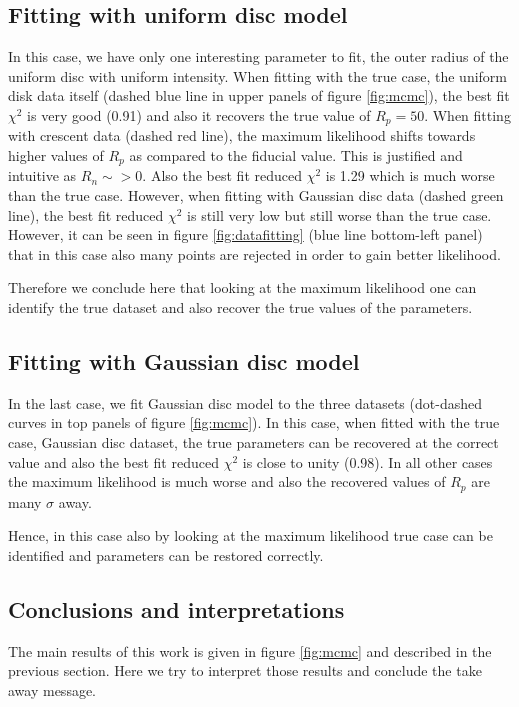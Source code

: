 \subsection{Fitting with uniform disc model}
In this case, we have only one interesting parameter to fit, the outer radius of the uniform disc with uniform intensity. When fitting with the true case, the uniform disk data itself (dashed blue line in upper panels of figure \ref{fig:mcmc}), the best fit $\chi^2$ is very good (0.91) and also it recovers the true value of $R_p=50$. When fitting with crescent data (dashed red line), the maximum likelihood shifts towards higher values of $R_p$ as compared to the fiducial value. This is justified and intuitive as $R_n \sim > 0$. Also the best fit reduced $\chi^2$ is 1.29 which is much worse than the true case. However, when fitting with Gaussian disc data (dashed green line), the best fit reduced $\chi^2$ is still very low but still worse than the true case. However, it can be seen in figure \ref{fig:datafitting} (blue line bottom-left panel) that in this case also many points are rejected in order to gain better likelihood.

Therefore we conclude here that looking at the maximum likelihood one can identify the true dataset and also recover the true values of the parameters. 


\subsection{Fitting with Gaussian disc model}
In the last case, we fit Gaussian disc model to the three datasets (dot-dashed curves in top panels of figure \ref{fig:mcmc}). In this case, when fitted with the true case, Gaussian disc dataset, the true parameters can be recovered at the correct value and also the best fit reduced $\chi^2$ is close to unity (0.98). In all other cases the maximum likelihood is much worse and also the recovered values of $R_p$ are many $\sigma$ away.

Hence, in this case also by looking at the maximum likelihood true case can be identified and parameters can be restored correctly.



\subsection{Conclusions and interpretations}
The main results of this work is given in figure \ref{fig:mcmc} and described in the previous section. Here we try to interpret those results and conclude the take away message.

